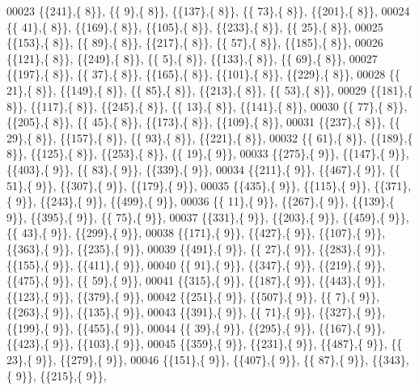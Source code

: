 \begin{DoxyCode}
00023 \{\{241\},\{  8\}\}, \{\{  9\},\{  8\}\}, \{\{137\},\{  8\}\}, \{\{ 73\},\{  8\}\}, \{\{201\},\{  8\}\},
00024 \{\{ 41\},\{  8\}\}, \{\{169\},\{  8\}\}, \{\{105\},\{  8\}\}, \{\{233\},\{  8\}\}, \{\{ 25\},\{  8\}\},
00025 \{\{153\},\{  8\}\}, \{\{ 89\},\{  8\}\}, \{\{217\},\{  8\}\}, \{\{ 57\},\{  8\}\}, \{\{185\},\{  8\}\},
00026 \{\{121\},\{  8\}\}, \{\{249\},\{  8\}\}, \{\{  5\},\{  8\}\}, \{\{133\},\{  8\}\}, \{\{ 69\},\{  8\}\},
00027 \{\{197\},\{  8\}\}, \{\{ 37\},\{  8\}\}, \{\{165\},\{  8\}\}, \{\{101\},\{  8\}\}, \{\{229\},\{  8\}\},
00028 \{\{ 21\},\{  8\}\}, \{\{149\},\{  8\}\}, \{\{ 85\},\{  8\}\}, \{\{213\},\{  8\}\}, \{\{ 53\},\{  8\}\},
00029 \{\{181\},\{  8\}\}, \{\{117\},\{  8\}\}, \{\{245\},\{  8\}\}, \{\{ 13\},\{  8\}\}, \{\{141\},\{  8\}\},
00030 \{\{ 77\},\{  8\}\}, \{\{205\},\{  8\}\}, \{\{ 45\},\{  8\}\}, \{\{173\},\{  8\}\}, \{\{109\},\{  8\}\},
00031 \{\{237\},\{  8\}\}, \{\{ 29\},\{  8\}\}, \{\{157\},\{  8\}\}, \{\{ 93\},\{  8\}\}, \{\{221\},\{  8\}\},
00032 \{\{ 61\},\{  8\}\}, \{\{189\},\{  8\}\}, \{\{125\},\{  8\}\}, \{\{253\},\{  8\}\}, \{\{ 19\},\{  9\}\},
00033 \{\{275\},\{  9\}\}, \{\{147\},\{  9\}\}, \{\{403\},\{  9\}\}, \{\{ 83\},\{  9\}\}, \{\{339\},\{  9\}\},
00034 \{\{211\},\{  9\}\}, \{\{467\},\{  9\}\}, \{\{ 51\},\{  9\}\}, \{\{307\},\{  9\}\}, \{\{179\},\{  9\}\},
00035 \{\{435\},\{  9\}\}, \{\{115\},\{  9\}\}, \{\{371\},\{  9\}\}, \{\{243\},\{  9\}\}, \{\{499\},\{  9\}\},
00036 \{\{ 11\},\{  9\}\}, \{\{267\},\{  9\}\}, \{\{139\},\{  9\}\}, \{\{395\},\{  9\}\}, \{\{ 75\},\{  9\}\},
00037 \{\{331\},\{  9\}\}, \{\{203\},\{  9\}\}, \{\{459\},\{  9\}\}, \{\{ 43\},\{  9\}\}, \{\{299\},\{  9\}\},
00038 \{\{171\},\{  9\}\}, \{\{427\},\{  9\}\}, \{\{107\},\{  9\}\}, \{\{363\},\{  9\}\}, \{\{235\},\{  9\}\},
00039 \{\{491\},\{  9\}\}, \{\{ 27\},\{  9\}\}, \{\{283\},\{  9\}\}, \{\{155\},\{  9\}\}, \{\{411\},\{  9\}\},
00040 \{\{ 91\},\{  9\}\}, \{\{347\},\{  9\}\}, \{\{219\},\{  9\}\}, \{\{475\},\{  9\}\}, \{\{ 59\},\{  9\}\},
00041 \{\{315\},\{  9\}\}, \{\{187\},\{  9\}\}, \{\{443\},\{  9\}\}, \{\{123\},\{  9\}\}, \{\{379\},\{  9\}\},
00042 \{\{251\},\{  9\}\}, \{\{507\},\{  9\}\}, \{\{  7\},\{  9\}\}, \{\{263\},\{  9\}\}, \{\{135\},\{  9\}\},
00043 \{\{391\},\{  9\}\}, \{\{ 71\},\{  9\}\}, \{\{327\},\{  9\}\}, \{\{199\},\{  9\}\}, \{\{455\},\{  9\}\},
00044 \{\{ 39\},\{  9\}\}, \{\{295\},\{  9\}\}, \{\{167\},\{  9\}\}, \{\{423\},\{  9\}\}, \{\{103\},\{  9\}\},
00045 \{\{359\},\{  9\}\}, \{\{231\},\{  9\}\}, \{\{487\},\{  9\}\}, \{\{ 23\},\{  9\}\}, \{\{279\},\{  9\}\},
00046 \{\{151\},\{  9\}\}, \{\{407\},\{  9\}\}, \{\{ 87\},\{  9\}\}, \{\{343\},\{  9\}\}, \{\{215\},\{  9\}\},

\end{DoxyCode}
